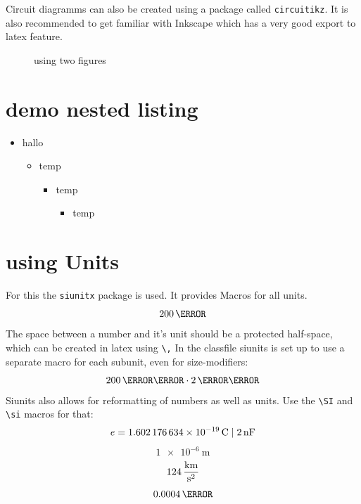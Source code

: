 \documentclass[	%
		11pt,a4paper,	%
		twoside,		%
		english,		%
		f1				%
	]{HsH-report}		%
\begin{document}
	Circuit diagramms can also be created using a package called \lstinline{circuitikz}. It is also recommended to get familiar with Inkscape which
	has a very good export to latex feature.
	\begin{figure}
		\graphicspath{{svg/build/}} %
		\hspace{2cm}
		\caption{using two figures}
	\end{figure}

\section{demo nested listing}
	\begin{itemize}
		\item hallo
		\begin{itemize}
			\item temp
			\begin{itemize}
				\item temp
				\begin{itemize}
					\item temp
				\end{itemize}
			\end{itemize}
		\end{itemize}
	\end{itemize}


\section{using Units}
	For this the \lstinline{siunitx} package is used. It provides Macros for all units.
	\begin{equation}
		200\,\kg
	\end{equation}
	The space between a number and it's unit should be a protected half-space, which can be created in latex using \lstinline{\,} In the classfile
	siunits is set up to use a separate macro for each subunit, even for size-modifiers:
	\begin{equation}
		200\,\milli\metre \cdot 2\,\mega\volt
	\end{equation}
	Siunits also allows for reformatting of numbers as well as units. Use the \lstinline{\SI} and \lstinline{\si} macros for that:
	\begin{equation}
		e = \SI{1.602176634E-19}{\coulomb} %
		\;|\; \SI[exponent-to-prefix]{2e-9}{\farad} %
	\end{equation}
	\begin{equation}
		\SI[exponent-to-prefix]{1e-6}{\metre}
	\end{equation}
	\begin{equation}
		124\,\si[per-mode=fraction]{\kilo\metre\per\second\squared} %
	\end{equation}
	\begin{equation}
		\num{0.0004}\,\lumen %
	\end{equation}
\end{document}
